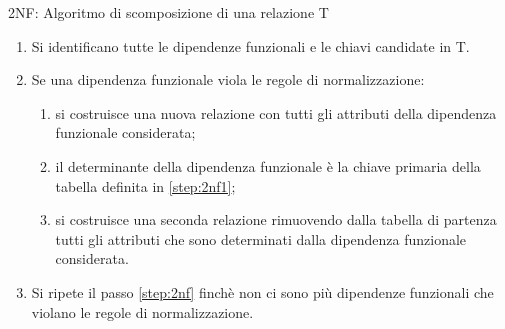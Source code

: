 \begin{frame}{2NF: Algoritmo di scomposizione di una relazione T}
\begin{minipage}{0.8\textwidth}
\begin{enumerate}
    \item Si identificano tutte le dipendenze funzionali e le chiavi candidate in T.
    \item Se una dipendenza funzionale viola le regole di normalizzazione:\label{step:2nf}
    \begin{minipage}{0.8\textwidth}
    \begin{enumerate}[a]
        \item si costruisce una nuova relazione con tutti gli attributi della dipendenza funzionale considerata;\label{step:2nf1}
        \item il determinante della dipendenza funzionale \`e la chiave primaria della tabella definita in \ref{step:2nf1};
        \item si costruisce una seconda relazione rimuovendo dalla tabella di partenza tutti gli attributi che sono determinati dalla dipendenza funzionale considerata.
    \end{enumerate}
    \end{minipage}
    \item Si ripete il passo \ref{step:2nf} finch\`e non ci sono pi\`u dipendenze funzionali che violano le regole di normalizzazione.
\end{enumerate}
\end{minipage}
\end{frame}
%
